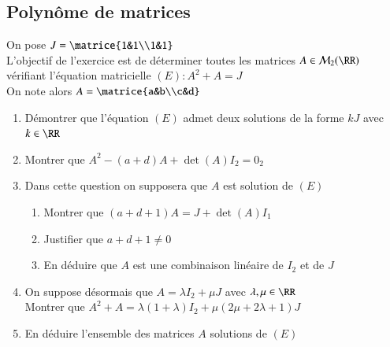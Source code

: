 \documentclass[oneside,12pt]{article}          %
\begin{document}
\subsection{Polynôme de matrices}
On pose $J=\matrice{1&1\\1&1}$ \\
L'objectif de l'exercice est de déterminer toutes les matrices $A\in\mathcal{M}_2(\RR)$ vérifiant l'équation matricielle $(E) : A^2+A=J$ \\
On note alors $A=\matrice{a&b\\c&d}$
\begin{enumerate}
    \item Démontrer que l'équation $(E)$ admet deux solutions de la forme $kJ$ avec $k\in\RR$
    \item Montrer que $A^2-(a+d)A+\det(A)I_2=0_2$
    \item Dans cette question on supposera que $A$ est solution de $(E)$
    \begin{enumerate}
        \item Montrer que $(a+d+1)A=J+\det(A)I_1$
        \item Justifier que $a+d+1\neq0$
        \item En déduire que $A$ est une combinaison linéaire de $I_2$ et de $J$
    \end{enumerate}
    \item On suppose désormais que $A=\lambda I_2+\mu J$ \quad avec $\lambda,\mu\in\RR$\\[5pt]
    Montrer que $A^2+A=\lambda(1+\lambda)I_2+\mu(2\mu+2\lambda+1)J$
    \item En déduire l'ensemble des matrices $A$ solutions de $(E)$
\end{enumerate}
\end{document}
